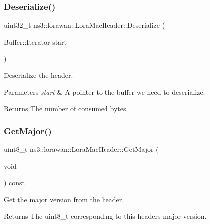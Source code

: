 \subsubsection{\texorpdfstring{Deserialize()}{Deserialize()}}
{\footnotesize\ttfamily uint32\+\_\+t ns3\+::lorawan\+::\+Lora\+Mac\+Header\+::\+Deserialize (\begin{DoxyParamCaption}\item[{Buffer\+::\+Iterator}]{start }\end{DoxyParamCaption})\hspace{0.3cm}{\ttfamily [virtual]}}

Deserialize the header.


\begin{DoxyParams}{Parameters}
{\em start} & A pointer to the buffer we need to deserialize. \\
\hline
\end{DoxyParams}
\begin{DoxyReturn}{Returns}
The number of consumed bytes. 
\end{DoxyReturn}
\mbox{\label{classns3_1_1lorawan_1_1LoraMacHeader_a1084c40b7386db84e8c184732cd3f780}} 
\subsubsection{\texorpdfstring{Get\+Major()}{GetMajor()}}
{\footnotesize\ttfamily uint8\+\_\+t ns3\+::lorawan\+::\+Lora\+Mac\+Header\+::\+Get\+Major (\begin{DoxyParamCaption}\item[{void}]{ }\end{DoxyParamCaption}) const}

Get the major version from the header.

\begin{DoxyReturn}{Returns}
The uint8\+\_\+t corresponding to this header\textquotesingle{}s major version. 
\end{DoxyReturn}
\mbox{\label{classns3_1_1lorawan_1_1LoraMacHeader_abe8c53eac32c0361756df3d798f70617}} 
